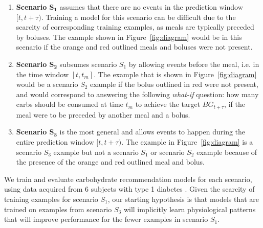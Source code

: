 \documentclass{ecai}
\begin{document}
\begin{enumerate}
	\item {\bf Scenario $\mathbf{S_1}$} assumes that there are no events in the prediction window $[t, t + \tau)$.  Training a model for this scenario can be difficult due to the scarcity of corresponding training examples, as meals are typically preceded by boluses. The example shown in Figure~\ref{fig:diagram} would be in this scenario if the orange and red outlined meals and boluses were not present.
	\item {\bf Scenario $\mathbf{S_2}$} subsumes scenario $S_{1}$ by allowing events before the meal, i.e. in the time window $[t, t_{m}]$. The example that is shown in Figure~\ref{fig:diagram} would be a scenario $S_{2}$ example if the bolus outlined in red were not present, and would correspond to answering the following {\it what-if} question: how many carbs should be consumed at time $t_m$ to achieve the target $BG_{t + \tau}$, if the meal were to be preceded by another meal and a bolus.
	\item {\bf Scenario $\mathbf{S_3}$} is the most general and allows events to happen during the entire prediction window $[t, t + \tau)$. The example in Figure~\ref{fig:diagram} is a scenario $S_{3}$ example but not a scenario $S_{1}$ or scenario $S_{2}$ example because of the presence of the orange and red outlined meal and bolus.
\end{enumerate} 
We train and evaluate carbohydrate recommendation models for each scenario, using data acquired from 6 subjects with type 1 diabetes \cite{ohiot1dm:marling:kdh18}. Given the scarcity of training examples for scenario $S_{1}$, our starting hypothesis is that models that are trained on examples from scenario $S_{3}$ will implicitly learn physiological patterns that will improve performance for the fewer examples in scenario $S_{1}$.


	
	
\end{document}
